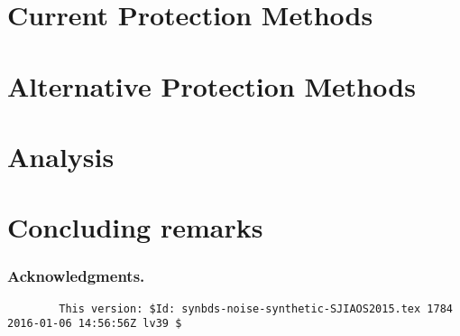 \documentclass[letter,11pt]{llncs}
\begin{document}
%
 
\section{Current Protection Methods}
\label{sec:item_suppression}



\section{Alternative Protection Methods}
\label{sec:synthetic_method}


\section{Analysis}
\label{sec:analysis}


\section{Concluding remarks}
\label{sec:conclusion}

\subsubsection*{Acknowledgments.} 
\label{sec:ack}


\clearpage





\clearpage
{\tiny
\begin{verbatim}
        This version: $Id: synbds-noise-synthetic-SJIAOS2015.tex 1784 2016-01-06 14:56:56Z lv39 $
\end{verbatim}
}
\end{document}
